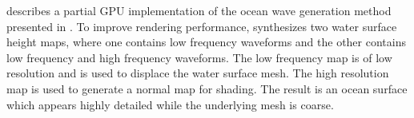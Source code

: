 
\citet{Mitchell:2005} describes a
partial GPU implementation of the ocean wave generation method presented in
\citet{course:simulatingocean}. To improve rendering performance,
\citeauthor{Mitchell:2005} synthesizes two water surface height maps,
where one contains low frequency waveforms and the other contains
low frequency and high frequency waveforms. The low frequency map
is of low resolution and is used to displace the water surface mesh.
The high resolution map is used to generate a normal map for shading.
The result is an ocean surface which appears highly detailed
while the underlying mesh is coarse.

